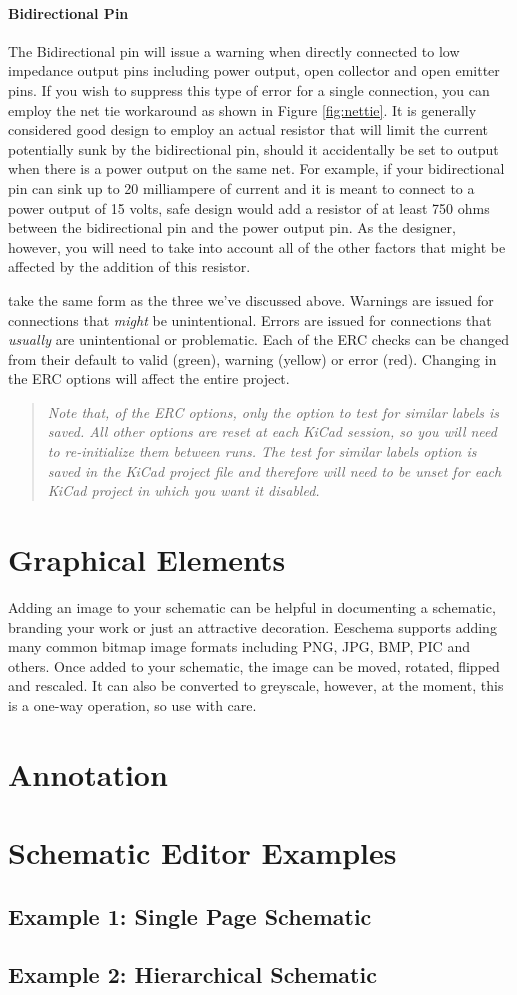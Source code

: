 \paragraph{Bidirectional Pin} The Bidirectional pin will issue a warning when directly connected to low impedance output pins including power output, open collector and open emitter pins.
If you wish to suppress this type of error for a single connection, you can employ the net tie workaround as shown in Figure \ref{fig:nettie}.
It is generally considered good design to employ an actual resistor that will limit the current potentially sunk by the bidirectional pin, should it accidentally be set to output when there is a power output on the same net.
For example, if your bidirectional pin can sink up to 20 milliampere of current and it is meant to connect to a power output of 15 volts, safe design would add a resistor of at least 750 ohms between the bidirectional pin and the power output pin.
As the designer, however, you will need to take into account all of the other factors that might be affected by the addition of this resistor.

 take the same form as the three we've discussed above.
Warnings are issued for connections that \textit{might} be unintentional.
Errors are issued for connections that \textit{usually} are unintentional or problematic.
Each of the ERC checks can be changed from their default to valid (green), warning (yellow) or error (red).
Changing in the ERC options will affect the entire project.

\begin{quote}
	\itshape Note that, of the ERC options, only the option to test for similar labels is saved.
	All other options are reset at each KiCad session, so you will need to re-initialize them between runs.
	The test for similar labels option is saved in the KiCad project file and therefore will need to be unset for each KiCad project in which you want it disabled.
\end{quote}

\section{Graphical Elements}
Adding an image to your schematic can be helpful in documenting a schematic, branding your work or just an attractive decoration.
Eeschema supports adding many common bitmap image formats including PNG, JPG, BMP, PIC and others.
Once added to your schematic, the image can be moved, rotated, flipped and rescaled.
It can also be converted to greyscale, however, at the moment, this is a one-way operation, so use with care.

\section{Annotation}



\section{Schematic Editor Examples}
\subsection{Example 1: Single Page Schematic}
\subsection{Example 2: Hierarchical Schematic}